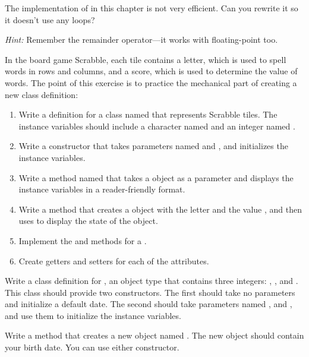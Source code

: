 \begin{exercise}  %

The implementation of  in this chapter is not very efficient.
Can you rewrite it so it doesn't use any loops?

{\em Hint:} Remember the remainder operator---it works with floating-point too.

\end{exercise}


\begin{exercise}  %

In the board game Scrabble, each tile contains a letter, which is used to spell words in rows and columns, and a score, which is used to determine the value of words.
The point of this exercise is to practice the mechanical part of creating a new class definition:

\begin{enumerate}

\item Write a definition for a class named  that represents Scrabble tiles.
The instance variables should include a character named  and an integer named .

\item Write a constructor that takes parameters named  and , and initializes the instance variables.

\item Write a method named  that takes a  object as a parameter and displays the instance variables in a reader-friendly format.

\item Write a  method that creates a  object with the letter  and the value , and then uses  to display the state of the object.

\item Implement the  and  methods for a .

\item Create getters and setters for each of the attributes.

\end{enumerate}

\end{exercise}


\begin{exercise}  %

Write a class definition for , an object type that contains three integers: , , and .
This class should provide two constructors.
The first should take no parameters and initialize a default date.
The second should take parameters named ,  and , and use them to initialize the instance variables.

Write a  method that creates a new  object named .
The new object should contain your birth date.
You can use either constructor.

\end{exercise}


